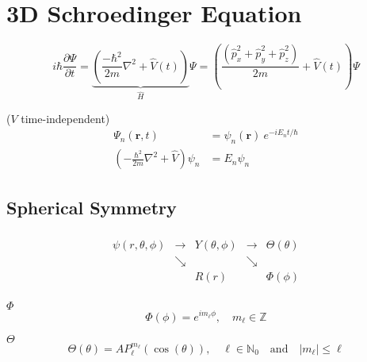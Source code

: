 \section{3D Schroedinger Equation}
\noindent\begin{equation*}
    i\hbar\frac{\partial\Psi}{\partial t} = \underbrace{\left(\frac{-\hbar^2}{2m}\nabla^2 + \widehat{V}(t)\right)}_{\widehat{H}}\Psi = \left(\frac{\left(\widehat{p}_x^2 + \widehat{p}_y^2 +\widehat{p}_z^2 \right)}{2m} + \widehat{V}(t)\right)\Psi
\end{equation*}

($V$ time-independent)
\begin{align*}
    \Psi_n(\mathbf{r},t)                                         & =\psi_n(\mathbf{r})\:e^{-iE_n t/\hbar} \\
    \left(-\frac{\hbar^2}{2m}\nabla^2 + \widehat{V}\right)\psi_n & = E_n \psi_n
\end{align*}

\subsection{Spherical Symmetry}
\renewcommand{\arraystretch}{0.7}
\setlength{\oldtabcolsep}{\tabcolsep}\setlength\tabcolsep{0pt}
\noindent\begin{equation*}
    \begin{matrix}
                            &             &                 &                              \\
        \psi(r,\theta,\phi) & \rightarrow & Y(\theta, \phi) & \rightarrow & \Theta(\theta) \\
                            & \searrow    &                 & \searrow    &                \\
                            &             & R(r)            &             & \Phi(\phi)     \\
    \end{matrix}
\end{equation*}
\renewcommand{\arraystretch}{1}
\setlength\tabcolsep{\oldtabcolsep}

 $\Phi$
\begin{equation*}
    \Phi(\phi)=e^{i m_\ell \phi}, \quad m_\ell \in \mathbb{Z}
\end{equation*}

 $\Theta$
\begin{equation*}
    \Theta(\theta) = A P_{\ell}^{m_\ell}(\cos(\theta)), \quad \ell \in \mathbb{N}_0 \quad \text{and} \quad |m_\ell| \leq \ell
\end{equation*}

